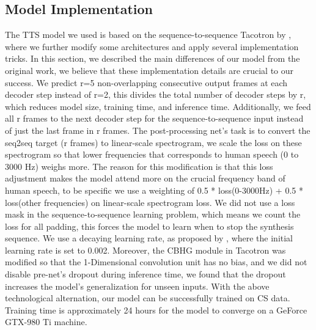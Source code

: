 \documentclass{article} %
\begin{document}
\begin{CJK}{UTF8}{bsmi}
\section{Model Implementation}
The TTS model we used is based on the sequence-to-sequence Tacotron by \citet{Wang2017}, where we further modify some architectures and apply several implementation tricks. In this section, we described the main differences of our model from the original work, we believe that these implementation details are crucial to our success. We predict r=5 non-overlapping consecutive output frames at each decoder step instead of r=2, this divides the total number of decoder steps by r, which reduces model size, training time, and inference time. Additionally, we feed all r frames to the next decoder step for the sequence-to-sequence input instead of just the last frame in r frames. The post-processing net’s task is to convert the seq2seq target (r frames) to linear-scale spectrogram, we scale the loss on these spectrogram so that lower frequencies that corresponds to human speech (0 to 3000 Hz) weighs more. The reason for this modification is that this loss adjustment makes the model attend more on the crucial frequency band of human speech, to be specific we use a weighting of 0.5 * loss(0-3000Hz) + 0.5 * loss(other frequencies) on linear-scale spectrogram loss. We did not use a loss mask in the sequence-to-sequence learning problem, which means we count the loss for all padding, this forces the model to learn when to stop the synthesis sequence. We use a decaying learning rate, as proposed by \citet{Vaswani2017}, where the initial learning rate is set to 0.002. Moreover, the CBHG module in Tacotron was modified so that the 1-Dimensional convolution unit has no bias, and we did not disable pre-net's dropout during inference time, we found that the dropout increases the model's generalization for unseen inputs. With the above technological alternation, our model can be successfully trained on CS data. Training time is approximately 24 hours for the model to converge on a GeForce GTX-980 Ti machine.


\end{CJK}
\end{document}
